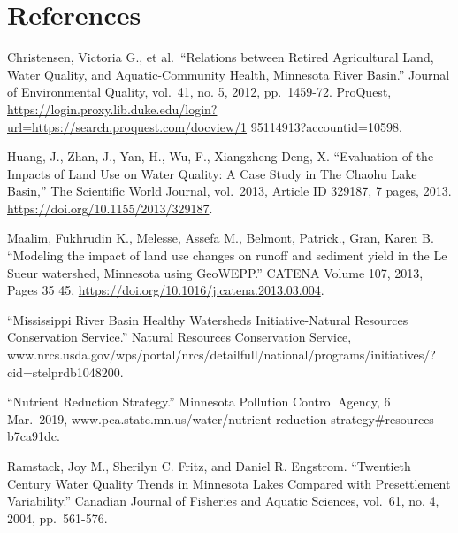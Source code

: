 \documentclass[12pt,]{article}
\begin{document}
\newpage

\hypertarget{references}{%
\section{References}\label{references}}

Christensen, Victoria G., et al.~``Relations between Retired
Agricultural Land, Water Quality, and Aquatic-Community Health,
Minnesota River Basin.'' Journal of Environmental Quality, vol.~41, no.
5, 2012, pp.~1459-72. ProQuest,
\url{https://login.proxy.lib.duke.edu/login?url=https://search.proquest.com/docview/1}
95114913?accountid=10598.

Huang, J., Zhan, J., Yan, H., Wu, F., Xiangzheng Deng, X. ``Evaluation
of the Impacts of Land Use on Water Quality: A Case Study in The Chaohu
Lake Basin,'' The Scientific World Journal, vol.~2013, Article ID
329187, 7 pages, 2013. \url{https://doi.org/10.1155/2013/329187}.

Maalim, Fukhrudin K., Melesse, Assefa M., Belmont, Patrick., Gran, Karen
B. ``Modeling the impact of land use changes on runoff and sediment
yield in the Le Sueur watershed, Minnesota using GeoWEPP.'' CATENA
Volume 107, 2013, Pages 35 45,
\url{https://doi.org/10.1016/j.catena.2013.03.004}.

``Mississippi River Basin Healthy Watersheds Initiative-Natural
Resources Conservation Service.'' Natural Resources Conservation
Service,
www.nrcs.usda.gov/wps/portal/nrcs/detailfull/national/programs/initiatives/?cid=stelprdb1048200.

``Nutrient Reduction Strategy.'' Minnesota Pollution Control Agency, 6
Mar.~2019,
www.pca.state.mn.us/water/nutrient-reduction-strategy\#resources-b7ca91dc.

Ramstack, Joy M., Sherilyn C. Fritz, and Daniel R. Engstrom. ``Twentieth
Century Water Quality Trends in Minnesota Lakes Compared with
Presettlement Variability.'' Canadian Journal of Fisheries and Aquatic
Sciences, vol.~61, no. 4, 2004, pp.~561-576.
\end{document}
